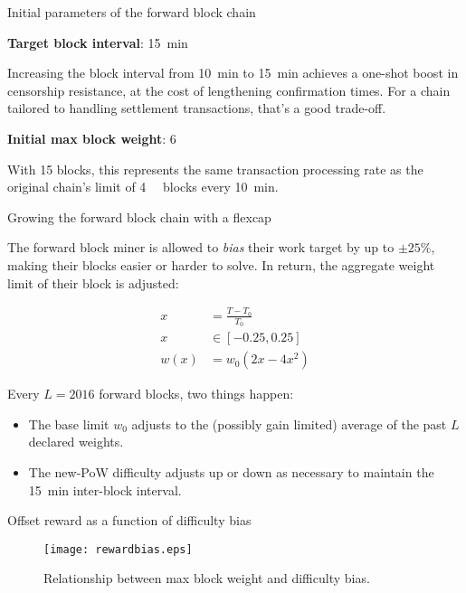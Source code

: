 \documentclass[10pt]{beamer}
\begin{document}
\begin{frame}{Initial parameters of the forward block chain}

  \textbf{Target block interval}: \SI{15}{\minute}

  Increasing the block interval from \SI{10}{\minute} to
  \SI{15}{\minute} achieves a one-shot boost in censorship resistance,
  at the cost of lengthening confirmation times.  For a chain tailored
  to handling settlement transactions, that's a good trade-off.

  \textbf{Initial max block weight}: \SI{6}{\mega\weight}

  With \SI{15}{\min} blocks, this represents the same transaction
  processing rate as the original chain's limit of
  \SI{4}{\mega\weight} blocks every \SI{10}{\minute}.

\end{frame}

\begin{frame}{Growing the forward block chain with a flexcap}

  The forward block miner is allowed to \emph{bias} their work target
  by up to $\pm 25\%$, making their blocks easier or harder to solve.
  In return, the aggregate weight limit of their block is adjusted:

  \begin{align*}
    x &= \frac{T - T_0}{T_0}\\
    x &\in [-0.25, 0.25]\\
    w(x) &= w_0(2x - 4x^2)
  \end{align*}

  Every $L=2016$ forward blocks, two things happen:

  \begin{itemize}

  \item The base limit $w_0$ adjusts to the (possibly gain limited) average of the past $L$ declared weights.

  \item The new-PoW difficulty adjusts up or down as necessary to maintain the \SI{15}{\minute} inter-block interval.

  \end{itemize}

\end{frame}

\begin{frame}{Offset reward as a function of difficulty bias}

  \begin{figure}
    \centering
    \texttt{[image: rewardbias.eps]}
    \caption{Relationship between max block weight and difficulty bias.}
    \label{rewardbiasfig}
  \end{figure}

\end{frame}
\end{document}
